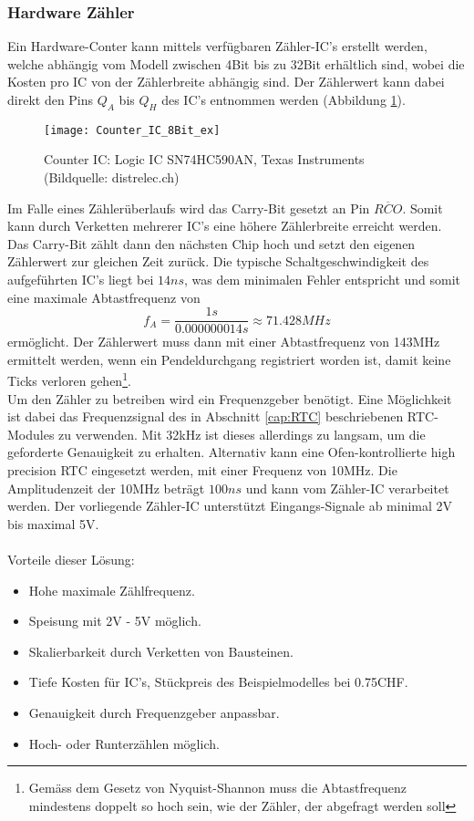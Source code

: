 	\subsubsection{Hardware Zähler}
	\label{cap:hw-counter}
		Ein Hardware-Conter kann mittels verfügbaren Zähler-IC's erstellt werden, welche abhängig vom Modell zwischen 4Bit bis zu 32Bit erhältlich sind, wobei die Kosten pro IC von der Zählerbreite abhängig sind. Der Zählerwert kann dabei direkt den Pins $Q_A$ bis $Q_H$ des IC's entnommen werden (Abbildung \ref{fig:SN74HC590AN}).
		\begin{figure}[H]
        	\centering
        	\texttt{[image: Counter\_IC\_8Bit\_ex]}
        	\caption{Counter IC: Logic IC SN74HC590AN, Texas Instruments (Bildquelle: distrelec.ch)}
        	\label{fig:SN74HC590AN}
    	\end{figure}
\noindent Im Falle eines Zählerüberlaufs wird das Carry-Bit gesetzt an Pin $\overline{RCO}$. Somit kann durch Verketten mehrerer IC's eine höhere Zählerbreite erreicht werden. Das Carry-Bit zählt dann den nächsten Chip hoch und setzt den eigenen Zählerwert zur gleichen Zeit zurück. Die typische Schaltgeschwindigkeit des aufgeführten IC's liegt bei $14ns$, was dem minimalen Fehler entspricht und somit eine maximale Abtastfrequenz von 
\[
	f_A = \frac{1s}{0.000 000 014s} \approx 71.428MHz
\]
ermöglicht. Der Zählerwert muss dann mit einer Abtastfrequenz von 143MHz ermittelt werden, wenn ein Pendeldurchgang registriert worden ist, damit keine Ticks verloren gehen\footnote{Gemäss dem Gesetz von Nyquist-Shannon muss die Abtastfrequenz mindestens doppelt so hoch sein, wie der Zähler, der abgefragt werden soll}.\\
Um den Zähler zu betreiben wird ein Frequenzgeber benötigt. Eine Möglichkeit ist dabei das Frequenzsignal des in Abschnitt \ref{cap:RTC} beschriebenen RTC-Modules zu verwenden. Mit 32kHz ist dieses allerdings zu langsam, um die geforderte Genauigkeit zu erhalten. Alternativ kann eine Ofen-kontrollierte high precision RTC eingesetzt werden, mit einer Frequenz von 10MHz. Die Amplitudenzeit der 10MHz beträgt $100ns$ und kann vom Zähler-IC verarbeitet werden. Der vorliegende Zähler-IC unterstützt Eingangs-Signale ab minimal 2V bis maximal 5V.\\
\\
Vorteile dieser Lösung:
    \begin{itemize}
    	\item Hohe maximale Zählfrequenz.
    	\item Speisung mit 2V - 5V möglich.
    	\item Skalierbarkeit durch Verketten von Bausteinen.
    	\item Tiefe Kosten für IC's, Stückpreis des Beispielmodelles bei 0.75CHF.
    	\item Genauigkeit durch Frequenzgeber anpassbar.
    	\item Hoch- oder Runterzählen möglich.
    \end{itemize}

